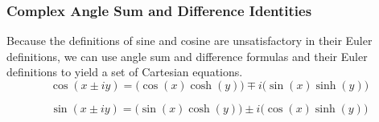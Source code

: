 \subsubsection{Complex Angle Sum and Difference Identities}\label{subsubsec:Complex_Angle_Sum_Difference_Identities}
Because the definitions of sine and cosine are unsatisfactory in their Euler definitions, we can use angle sum and difference formulas and their Euler definitions to yield a set of Cartesian equations.
\begin{equation}\label{eq:Cos_Angle_Sum_Difference}
  \cos(x \pm iy) = \bigl( \cos(x) \cosh(y) \bigr) \mp i \bigl( \sin(x) \sinh(y) \bigr)
\end{equation}

\begin{equation}\label{eq:Sin_Angle_Sum_Difference}
  \sin(x \pm iy) = \bigl( \sin(x) \cosh(y) \bigr) \pm i \bigl( \cos(x) \sinh(y) \bigr)
\end{equation}

